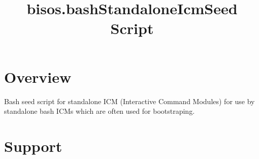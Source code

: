 \documentclass{article}
\begin{document}

\begin{comment}
*  [[elisp:(org-cycle)][| ]]  *DBLK: front-begin*                                       :: [[elisp:(beginning-of-buffer)][Top]] [[elisp:(delete-other-windows)][(1)]]  [[elisp:(org-cycle)][| ]]
\end{comment}


\begin{comment}
*  [[elisp:(org-cycle)][| ]]  *DBLK: copyright*                                       :: [[elisp:(beginning-of-buffer)][Top]] [[elisp:(delete-other-windows)][(1)]]  [[elisp:(org-cycle)][| ]]
\end{comment}


\begin{comment}
*  [[elisp:(org-cycle)][| ]]  *DBLK: front-end*                                       :: [[elisp:(beginning-of-buffer)][Top]] [[elisp:(delete-other-windows)][(1)]]  [[elisp:(org-cycle)][| ]]
\end{comment}


\begin{comment}
*  [[elisp:(org-cycle)][| ]]  *DBLK: main-begin*                                       :: [[elisp:(beginning-of-buffer)][Top]] [[elisp:(delete-other-windows)][(1)]]  [[elisp:(org-cycle)][| ]]
\end{comment}

\title{bisos.bashStandaloneIcmSeed Script}


\thispagestyle{empty}


\bigskip

\section{Overview}

Bash seed script for standalone ICM (Interactive Command Modules) for use
by standalone bash ICMs which are often used for bootstraping.


\section{Support}
\end{document}

